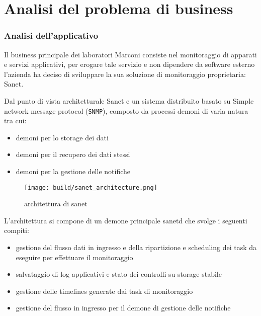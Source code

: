 \chapter{Analisi del problema di business}

\subsection{Analisi dell'applicativo}

Il business principale dei laboratori Marconi consiste nel monitoraggio di apparati e servizi applicativi, per erogare tale servizio e non dipendere da software esterno l'azienda ha deciso di sviluppare la sua soluzione di monitoraggio proprietaria: Sanet.

Dal punto di vista architetturale Sanet e un sistema distribuito basato su Simple network message protocol (\verb|SNMP|), composto da processi demoni di varia natura tra cui:

\begin{itemize}
    \item demoni per lo storage dei dati
    \item demoni per il recupero dei dati stessi
    \item demoni per la gestione delle notifiche
\end{itemize}

\begin{figure}[H]
    \centering
    \texttt{[image: build/sanet\_architecture.png]}
    \caption{architettura di sanet}
    \label{fig:enter-label}
\end{figure}

L'architettura si compone di un demone principale sanetd che svolge i seguenti compiti:

\begin{itemize}
  \item gestione del flusso dati in ingresso e della ripartizione e scheduling dei task da eseguire per effettuare il monitoraggio
  \item salvataggio di log applicativi e stato dei controlli su storage stabile
  \item gestione delle timelines generate dai task di monitoraggio
  \item gestione del flusso in ingresso per il demone di gestione delle notifiche
\end{itemize}

